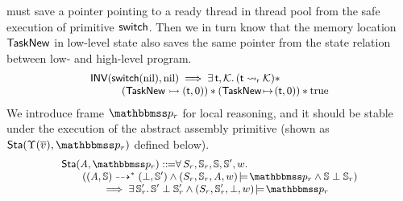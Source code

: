 must save a pointer pointing to a ready thread
in thread pool from the safe execution of primitive $\mathsf{switch}$.
Then we in turn know that the memory location $\mathsf{TaskNew}$
in low-level state also saves the same pointer
from the state relation
between low- and high-level program.
\[
    \small
    \begin{array}{l}
        \textsf{INV}{(\mathsf{switch}(\text{nil}), \text{nil})}
        \implies
        \exists \, \textsf{t}, \mathcal{K}. \,
        ({\textsf{t}} \leadsto_{\textsf{r}} {\mathcal{K}}) * \\
        \qquad\quad
        ({\mathsf{TaskNew}} \rightarrowtail {(\textsf{t}, 0)})
        *
        ({\mathsf{TaskNew}} \!\mapsto\! {(\textsf{t}, 0)})
        * \text{true}
    \end{array}
\]
We introduce frame $\relastP_r$ for local reasoning,
and it should be stable under the execution
of the abstract assembly primitive
(shown as $\Sta(\hprim(\args{\val}), \relastP_r)$
defined below).
\[
    \small
    \begin{array}{l}
        \Sta(\primcom, \relastP_r)
        \define
        \forall \, \state_r, \hpstate_r, \hpstate,
        \hpstate', \word. \\
        \qquad
        (\primTransMulti{(\primcom, \hpstate)}{*}{(\primdone, \hpstate')}
        \land \asrtmodel{(\state_r, \hpstate_r, \primcom, \word)}{\relastP_r}
        \land \hpstate\perp\hpstate_r) \\
        \qquad\qquad
        \implies
        \exists\, \hpstate_r'. \,
        \hpstate'\perp\hpstate_r' \land
        \asrtmodel{(\state_r, \hpstate_r', \primdone, \word)}
            {\relastP_r}
    \end{array}
\]

